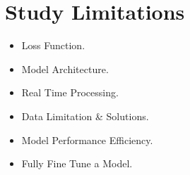 \section{Study Limitations}

\begin{frame}

    \vspace{1em}

    \begin{itemize}
        \itemsep1em
        \item Loss Function.
        \item Model Architecture.
        \item Real Time Processing.
        \item Data Limitation \& Solutions.
        \item Model Performance Efficiency.
        \item Fully Fine Tune a Model.
    \end{itemize}
    
\end{frame}

